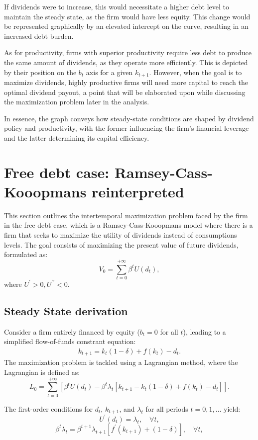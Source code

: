 \documentclass[12pt]{article}
\begin{document}
If dividends were to increase, this would necessitate a higher debt level to maintain the steady state, as the firm
would have less equity. This change would be represented graphically by an elevated intercept on the curve, resulting in
an increased debt burden. 

As for productivity, firms with superior productivity require less debt to produce the same amount of dividends, as they
operate more efficiently. This is depicted by their position on the \(b_t\) axis for a given \(k_{t+1}\). However, when
the goal is to maximize dividends, highly productive firms will need more capital to reach the optimal dividend payout,
a point that will be elaborated upon while discussing the maximization problem later in the analysis. 

In essence, the graph conveys how steady-state conditions are shaped by dividend policy and productivity, with the
former influencing the firm's financial leverage and the latter determining its capital efficiency. 




\section{Free debt case: Ramsey-Cass-Kooopmans reinterpreted}
This section outlines the intertemporal maximization problem faced by the firm in the free debt case, which is a
Ramsey-Cass-Kooopmans model where there is a firm that seeks to maximize the utility of dividends instead of
consumptions levels.
The goal consists of maximizing  the present value of future dividends, formulated as:
\[V_0 = \sum_{t=0}^{+\infty}{\beta^t U(d_t)},\]
where \(U^{\prime}>0, U^{\prime \prime}<0\).
\subsection{Steady State derivation}
Consider a firm entirely financed by equity (\(b_t=0\)  for all \(t\)), leading to a simplified flow-of-funds constrant equation:
\begin{align}
    k_{t+1} = k_{t}(1 - \delta) + f(k_{t}) - d_{t}.  \label{eq13}
\end{align}
The maximization problem is tackled using a Lagrangian method, where the Lagrangian is defined as:
\[L_0 = \sum_{t=0}^{+\infty}\left[{\beta^t U(d_t) - \beta^t \lambda_t\left[k_{t+1} - k_{t}(1 - \delta) + f(k_t) - d_t\right]}\right].\]

The first-order conditions for \(d_{t}\), \(k_{t+1}\), and \(\lambda_t\) for all periods \(t=0,1,\ldots\) yield:
\[
U^{\prime}(d_{t}) = \lambda_t, \quad \forall t,
\]
\[
\beta^t \lambda_t = \beta^{t+1} \lambda_{t+1}[f^{\prime}(k_{t+1}) + (1-\delta)], \quad \forall t,
\]
\end{document}
